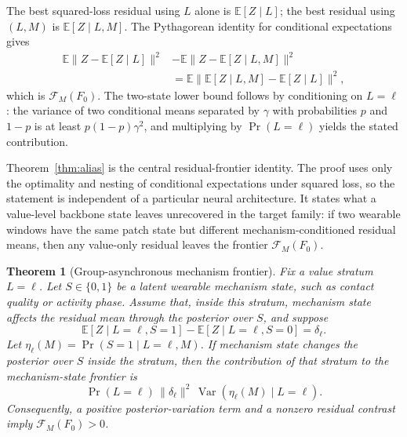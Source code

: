 ﻿\documentclass[10pt,conference]{IEEEtran}
\newtheorem{theorem}{Theorem}
\DeclareMathOperator{\Var}{Var}
\newcommand{\E}{\mathbb{E}}
\begin{document}
\begin{IEEEproof}
The best squared-loss residual using \(L\) alone is \(\E[Z\mid L]\); the best
residual using \((L,M)\) is \(\E[Z\mid L,M]\).  The Pythagorean identity for
conditional expectations gives
\begin{equation}
\begin{aligned}
\E\|Z-\E[Z\mid L]\|^2
&-\E\|Z-\E[Z\mid L,M]\|^2\\
&=\E\|\E[Z\mid L,M]-\E[Z\mid L]\|^2,
\end{aligned}
\end{equation}
which is \(\mathcal{F}_M(F_0)\).  The two-state lower bound follows by
conditioning on \(L=\ell\): the variance of two conditional means separated by
\(\gamma\) with probabilities \(p\) and \(1-p\) is at least
\(p(1-p)\gamma^2\), and multiplying by \(\Pr(L=\ell)\) yields the stated
contribution.
\end{IEEEproof}

Theorem~\ref{thm:alias} is the central residual-frontier identity.  The proof
uses only the optimality and nesting of conditional expectations under squared
loss, so the statement is independent of a particular neural architecture.  It states
what a value-level backbone state leaves unrecovered in the target family:
if two wearable windows have the same patch state but different
mechanism-conditioned residual means, then any value-only residual leaves the
frontier \(\mathcal{F}_M(F_0)\).

\begin{theorem}[Group-asynchronous mechanism frontier]
\label{thm:phase}
Fix a value stratum \(L=\ell\).  Let \(S\in\{0,1\}\) be a latent wearable
mechanism state, such as contact quality or activity phase.  Assume that,
inside this stratum, mechanism state affects the residual mean through the
posterior over \(S\), and suppose
\begin{equation}
\E[Z\mid L=\ell,S=1]-\E[Z\mid L=\ell,S=0]=\delta_\ell .
\end{equation}
Let \(\eta_\ell(M)=\Pr(S=1\mid L=\ell,M)\).  If mechanism state changes the
posterior over \(S\) inside the stratum, then the contribution of that stratum
to the mechanism-state frontier is
\begin{equation}
\Pr(L=\ell)\,\|\delta_\ell\|^2\,\Var\!\left(\eta_\ell(M)\mid L=\ell\right).
\end{equation}
Consequently, a positive posterior-variation term and a nonzero residual
contrast imply \(\mathcal{F}_M(F_0)>0\).
\end{theorem}
\end{document}
